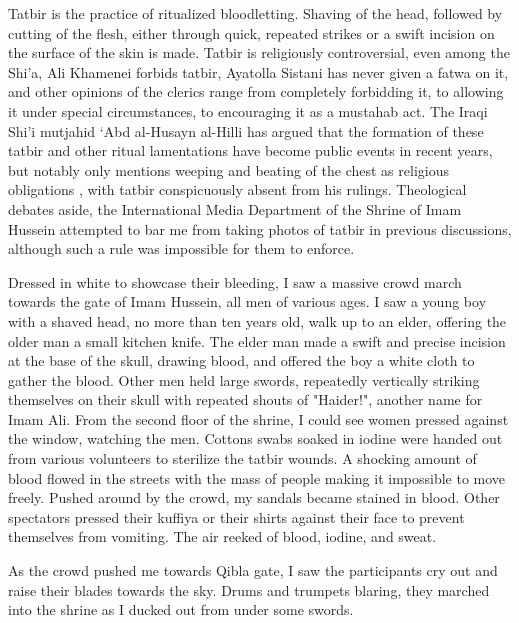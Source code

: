 Tatbir is the practice of ritualized bloodletting. Shaving of the head, followed by cutting of the flesh, either through quick, repeated strikes or a swift incision on the surface of the skin is made. Tatbir is religiously controversial, even among the Shi'a, Ali Khamenei forbids tatbir, Ayatolla Sistani has never given a fatwa on it, and other opinions of the clerics range from completely forbidding it, to allowing it under special circumstances, to encouraging it as a mustahab act. The Iraqi Shi'i mutjahid ‘Abd al-Husayn al-Hilli has argued that the formation of these tatbir and other ritual lamentations have become public events in recent years, but notably only mentions weeping and beating of the chest as religious obligations \cite[85]{weiss_shadow_2010}, with tatbir conspicuously absent from his rulings. Theological debates aside, the International Media Department of the Shrine of Imam Hussein attempted to bar me from taking photos of tatbir in previous discussions, although such a rule was impossible for them to enforce. 

Dressed in white to showcase their bleeding, I saw a massive crowd march towards the gate of Imam Hussein, all men of various ages. I saw a young boy with a shaved head, no more than ten years old, walk up to an elder, offering the older man a small kitchen knife. The elder man made a swift and precise incision at the base of the skull, drawing blood, and offered the boy a white cloth to gather the blood. Other men held large swords, repeatedly vertically striking themselves on their skull with repeated shouts of "Haider!", another name for Imam Ali. From the second floor of the shrine, I could see women pressed against the window, watching the men. Cottons swabs soaked in iodine were handed out from various volunteers to sterilize the tatbir wounds. A shocking amount of blood flowed in the streets with the mass of people making it impossible to move freely. Pushed around by the crowd, my sandals became stained in blood. Other spectators pressed their kuffiya or their shirts against their face to prevent themselves from vomiting. The air reeked of blood, iodine, and sweat. 

As the crowd pushed me towards Qibla gate, I saw the participants cry out and raise their blades towards the sky. Drums and trumpets blaring, they marched into the shrine as I ducked out from under some swords.

